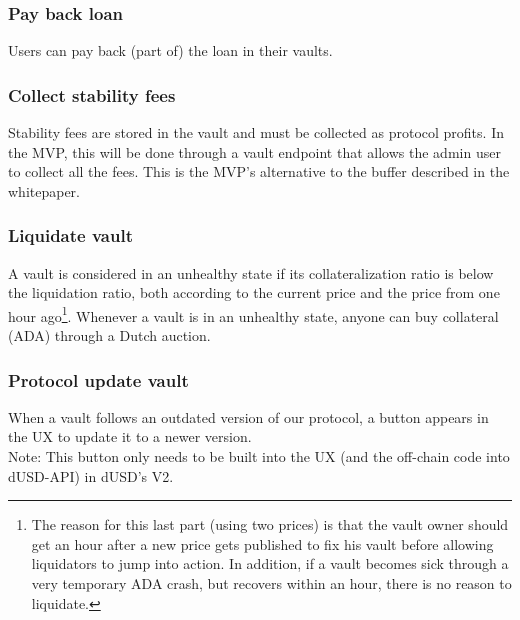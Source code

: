 \documentclass{article} %
\begin{document}
\subsubsection*{Pay back loan}

Users can pay back (part of) the loan in their vaults.

\subsubsection*{Collect stability fees}

Stability fees are stored in the vault and must be collected as protocol
profits. In the MVP, this will be done through a vault endpoint that allows the
admin user to collect all the fees. This is the MVP's alternative to the buffer
described in the whitepaper.


\subsubsection*{Liquidate vault}

A vault is considered in an unhealthy state if its collateralization ratio is
below the liquidation ratio, both according to the current price and the price
from one hour ago\footnote{
  The reason for this last part (using two prices) is that the vault owner
  should get an hour after a new price gets published to fix his vault before
  allowing liquidators to jump into action. In addition, if a vault becomes sick
  through a very temporary ADA crash, but recovers within an hour, there is no
  reason to liquidate.}.
Whenever a vault is in an unhealthy state, anyone can buy collateral (ADA)
through a Dutch auction.

\subsubsection*{Protocol update vault}

When a vault follows an outdated version of our protocol, a button appears in
the UX to update it to a newer version. \\

Note: This button only needs to be built into the UX (and the off-chain code
into dUSD-API) in dUSD's V2.
\end{document}
